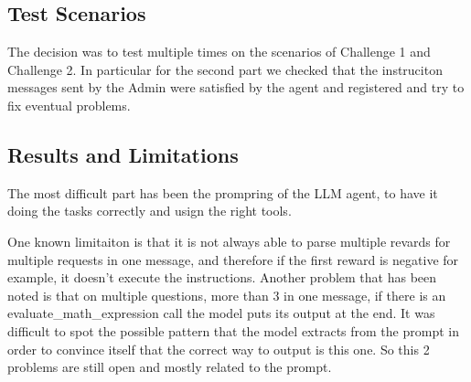 \documentclass[a4paper,11pt]{article}
\begin{document}
\subsection{Test Scenarios}
The decision was to test multiple times on the scenarios of Challenge 1 and Challenge 2.
In particular for the second part we checked that the instruciton messages sent by the Admin 
were satisfied by the agent and registered and try to fix eventual problems.

\subsection{Results and Limitations}
The most difficult part has been the prompring of the LLM agent, 
to have it doing the tasks correctly and usign the right tools.

One known limitaiton is that it is not always able to parse multiple revards for multiple requests
in one message, and therefore if the first reward is negative for example, it doesn't execute the instructions.
Another problem that has been noted is that on multiple questions, more than 
3 in one message, if there is an evaluate\_math\_expression call the model puts its output at the end.
It was difficult to spot the possible pattern that the model extracts from the prompt
in order to convince itself that the correct way to output is this one. So this 2 problems are still open 
and mostly related to the prompt.






\end{document}
